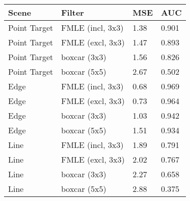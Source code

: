 \begin{figure}[h!]
\begin{minipage}[c]{0.5\textwidth}
	\\
\end{minipage}
\begin{minipage}[c]{0.38\textwidth}
\begin{tabular}{|l|l|l|l|}
\hline
Scene 				& Filter 						& MSE 	& AUC \\
\hline
Point Target 	& FMLE (incl, 3x3) 	& 1.38	& 0.901 \\
Point Target 	& FMLE (excl, 3x3) 	& 1.47	& 0.893 \\
Point Target 	& boxcar (3x3) 			& 1.56	& 0.826 \\
Point Target 	& boxcar (5x5) 			& 2.67	& 0.502 \\
\hline
Edge 	& FMLE (incl, 3x3) 	& 0.68	& 0.969 \\
Edge 	& FMLE (excl, 3x3) 	& 0.73	& 0.964 \\
Edge 	& boxcar (3x3) 			& 1.03	& 0.942 \\
Edge 	& boxcar (5x5) 			& 1.51	& 0.934 \\
\hline
Line 	& FMLE (incl, 3x3) 	& 1.89	& 0.791 \\
Line 	& FMLE (excl, 3x3) 	& 2.02	& 0.767 \\
Line 	& boxcar (3x3) 			& 2.27	& 0.658 \\
Line 	& boxcar (5x5) 			& 2.88	& 0.375 \\

\end{tabular}
\end{minipage}
\end{figure}
